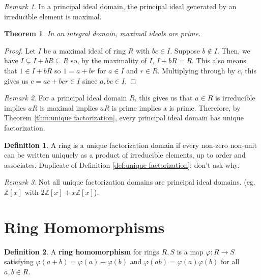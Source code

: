 \documentclass[parskip=half]{scrartcl}  %
\theoremstyle{definition}
\newtheorem{definition}{Definition}[section]
\theoremstyle{plain}
\newtheorem{theorem}{Theorem}[definition]
\theoremstyle{remark}
\newtheorem{remark}{Remark}[definition]
\begin{document}
\begin{remark}
    In a principal ideal domain, the principal ideal generated by an
    irreducible element is maximal.
\end{remark}

\begin{theorem}
    In an integral domain, maximal ideals are prime.
\end{theorem}

\begin{proof}
    Let $I$ be a maximal ideal of ring $R$ with $bc\in I$.
    Suppose $b\notin I$.
    Then, we have $I\subsetneq I+bR\subseteq R$ so, by the maximality of $I$,
    $I+bR=R$.
    This also means that $1\in I+bR$ so $1=a+br$ for $a\in I$ and $r\in R$.
    Multiplying through by $c$, this gives us $c=ac+bcr\in I$ since $a,bc\in I$.
\end{proof}

\begin{remark}
    For a principal ideal domain $R$, this gives us that $a\in R$ is
    irreducible implies $aR$ is maximal implies $aR$ is prime implies a is prime.
    Therefore, by Theorem \ref{thm:unique factorization}, every principal ideal
    domain has unique factorization.
\end{remark}

\begin{definition}
    A ring is a unique factorization domain if every non-zero non-unit can be
    written uniquely as a product of irreducible elements, up to order and
    associates.
    Duplicate of Definition \ref{def:unique factorization}; don't ask why.
\end{definition}

\begin{remark}
    Not all unique factorization domains are principal ideal domains.
    (eg. $\mathbb{Z}[x]$ with $2\mathbb{Z}[x]+x\mathbb{Z}[x]$).
\end{remark}


\section{Ring Homomorphisms}


\begin{definition}
    A \textbf{ring homomorphism} for rings $R,S$ is a map $\varphi:R\to S$
    satisfying $\varphi(a+b)=\varphi(a)+\varphi(b)$ and
    $\varphi(ab)=\varphi(a)\varphi(b)$ for all $a,b\in R$.
\end{definition}
\end{document}
